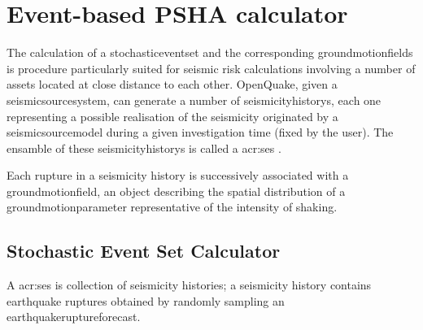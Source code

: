 %
\section{Event-based PSHA calculator}
\label{chap:stochastic_psha}
%
The calculation of a \gls{stochasticeventset}  
and the corresponding \glspl{groundmotionfield} is procedure particularly 
suited for seismic risk calculations involving a number of assets located 
at close distance to each other.
%
OpenQuake, given a \gls{seismicsourcesystem}, can generate a number of 
\glspl{seismicityhistory}, each one representing a possible realisation of 
the seismicity originated by a \gls{seismicsourcemodel} during a given 
investigation time (fixed by the user). 
%
The ensamble of these \glspl{seismicityhistory} is called a 
\gls{acr:ses} .

Each rupture in a seismicity history is successively associated with a 
\gls{groundmotionfield}, an object describing the spatial distribution 
of a \gls{groundmotionparameter} representative of the intensity of 
shaking. 
%
\subsection{Stochastic Event Set Calculator}
A \gls{acr:ses} is collection of seismicity histories; a seismicity 
history contains earthquake ruptures obtained by randomly sampling 
an \gls{earthquakeruptureforecast}. 
%

